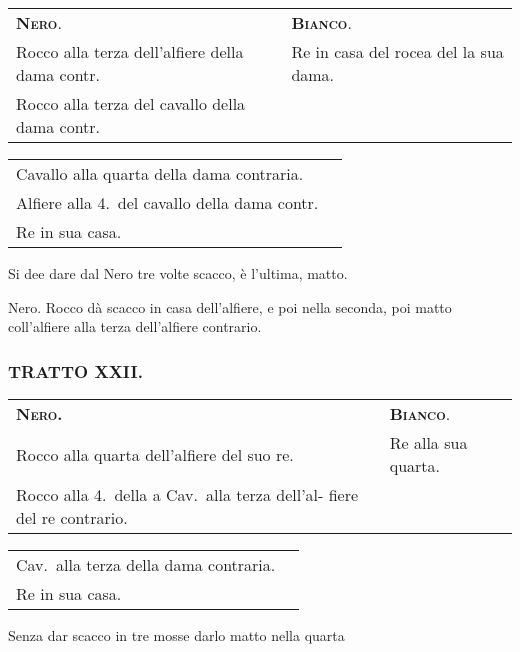 \documentclass[11pt,a6paper]{article}
\begin{document}
{\small\noindent\begin{tabular}{@{}p{3.84cm}p{3.84cm}}
{\bfseries\scshape Nero}. & {\bfseries\scshape Bianco}. \\
Rocco alla terza dell'alfiere della dama contr. & Re in casa del rocea del la sua dama.\\
Rocco alla terza del cavallo della dama contr.\\
\end{tabular}

\noindent\begin{tabular}{@{}p{3.84cm}p{3.84cm}}
Cavallo alla quarta della dama contraria.\\
Alfiere alla 4.\ del cavallo della dama contr.\\
Re in sua casa.
\end{tabular}}

Si dee dare dal Nero tre volte scacco, è l'ultima, matto.

Nero. Rocco dà scacco in casa dell'alfiere, e poi
nella seconda, poi matto coll'alfiere alla terza dell'alfiere contrario.

\subsubsection{TRATTO XXII.}

{\small
\noindent\begin{tabular}{@{}p{3.84cm}p{3.84cm}}
{\bfseries\scshape Nero.}& {\bfseries\scshape Bianco}.\\
Rocco alla quarta dell'alfiere del suo re. & Re alla sua quarta.\\
Rocco alla 4.\ della a Cav.\ alla terza dell'al- fiere del re contrario.\\
\end{tabular}

\noindent\begin{tabular}{@{}p{3.84cm}p{3.84cm}}
Cav.\ alla terza della dama contraria.\\
Re in sua casa.\\
\end{tabular}}

Senza dar scacco in tre mosse darlo matto nella quarta

\end{document}
